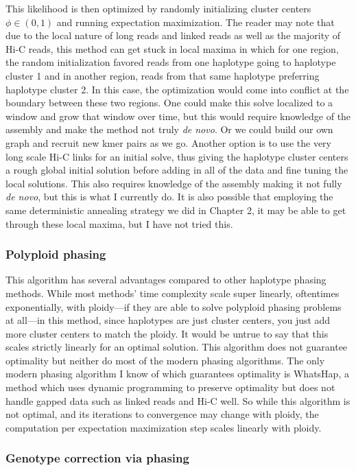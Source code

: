 \par{
This likelihood is then optimized by randomly initializing cluster centers $\phi \in (0,1)$ and running expectation maximization. The reader may note that due to the local nature of long reads and linked reads as well as the majority of Hi-C reads, this method can get stuck in local maxima in which for one region, the random initialization favored reads from one haplotype going to haplotype cluster 1 and in another region, reads from that same haplotype preferring haplotype cluster 2. In this case, the optimization would come into conflict at the boundary between these two regions. One could make this solve localized to a window and grow that window over time, but this would require knowledge of the assembly and make the method not truly \textit{de novo}. Or we could build our own graph and recruit new kmer pairs as we go. Another option is to use the very long scale Hi-C links for an initial solve, thus giving the haplotype cluster centers a rough global initial solution before adding in all of the data and fine tuning the local solutions. This also requires knowledge of the assembly making it not fully \textit{de novo}, but this is what I currently do. It is also possible that employing the same deterministic annealing strategy we did in Chapter 2, it may be able to get through these local maxima, but I have not tried this.
}
\subsubsection{Polyploid phasing}
\par{
This algorithm has several advantages compared to other haplotype phasing methods. While most methods' time complexity scale super linearly, oftentimes exponentially, with ploidy---if they are able to solve polyploid phasing problems at all---in this method, since haplotypes are just cluster centers, you just add more cluster centers to match the ploidy. It would be untrue to say that this scales strictly linearly for an optimal solution. This algorithm does not guarantee optimality but neither do most of the modern phasing algorithms. The only modern phasing algorithm I know of which guarantees optimality is WhatsHap, a method which uses dynamic programming to preserve optimality but does not handle gapped data such as linked reads and Hi-C well\cite{whatshap}. So while this algorithm is not optimal, and its iterations to convergence may change with ploidy, the computation per expectation maximization step scales linearly with ploidy.
}
\subsubsection{Genotype correction via phasing}


